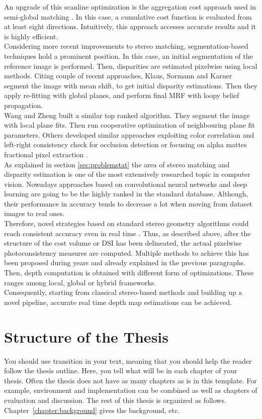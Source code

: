 An upgrade of this scanline optimization is the aggregation cost approach used in semi-global matching \citep{Hirschmuller2008}.
In this case, a cumulative cost function is evaluated from at least eight directions.
Intuitively, this approach accesses accurate results and it is highly efficient. \\
Considering more recent improvements to stereo matching, segmentation-based techniques hold a prominent position.
In this case, an initial segmentation of the reference image is performed.
Then, disparities are estimated pixelwise using local methods.
Citing couple of recent approaches, Klaus, Sormann and Karner \citep{Klaus2006} segment the image with mean shift, to get initial disparity estimations. 
Then they apply re-fitting with global planes, and perform final MRF with loopy belief propagation. \\
Wang and Zheng \citep{Wang2008} built a similar top ranked algorithm.
They segment the image with local plane fits. 
Then run cooperative optimization of neighbouring plane fit parameters. 
Others developed similar approaches exploiting color correlation and left-right consistency check for occlusion detection \citep{yang2008stereo} or focusing on alpha mattes fractional pixel extraction \citep{bleyer2009stereo}.\\
As explained in section \ref{sec:problemstat} the area of stereo matching and disparity estimation is one of the most extensively researched topic in computer vision.
Nowadays approaches based on convolutional neural networks and deep learning are going to be the highly ranked in the standard database.
Although, their performance in accuracy tends to decrease a lot when moving from dataset images to real ones.\\
Therefore, novel strategies based on standard stereo geometry algorithms could reach consistent accuracy even in real time \citep{Hernandez-Juarez2016}.
Thus, as described above, after the structure of the cost volume or DSI has been delineated, the actual pixelwise photoconsistency measures are computed.
Multiple methods to achieve this has been proposed during years and already explained in the previous paragraphs.
Then, depth computation is obtained with different form of optimizations. 
These ranges among local, global or hybrid frameworks. \\
Consequently, starting from classical stereo-based methods and building up a novel pipeline, accurate real time depth map estimations can be achieved.
 
\section{Structure of the Thesis}
\label{section:structure} 

You should use transition in your text, meaning that you should help
the reader follow the thesis outline. Here, you tell what will be in
each chapter of your thesis. Often the thesis does not have as many
chapters as is in this template. For example, environment and
implementation can be combined as well as chapters of evaluation and
discussion.  The rest of this thesis is organized as
follows. Chapter~\ref{chapter:background} gives the background, etc.

